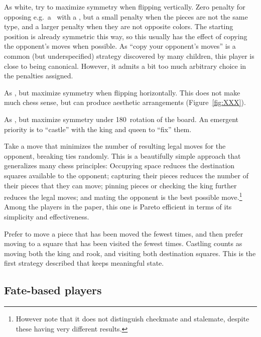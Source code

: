 \documentclass[10pt,preprint,twocolumn]{acmart}
\newcommand{\King}[1][1.95ex]{%
\adjustbox{Trim=2pt 2pt 2pt 0pt,width=#1,raise=-0.06ex,margin=0.13ex 0ex 0.13ex 0ex}{\BlackKingOnWhite}%
}%
\begin{document}
 As white, try to maximize symmetry
when flipping vertically. Zero penalty for opposing e.g.~a \King\, with
a \king, but a small penalty when the pieces are not the same type,
and a larger penalty when they are not opposite colors. The starting
position is already symmetric this way, so this usually has the effect
of copying the opponent's moves when possible. As ``copy your
opponent's moves'' is a common (but underspecified) strategy
discovered by many children, this player is close to being canonical.
However, it admits a bit too much arbitrary choice in the penalties
assigned.

 As , but
maximize symmetry when flipping horizontally. This does not make much
chess sense, but can produce aesthetic arrangements
(Figure~\ref{fig:XXX}).

 As , but maximize
symmetry under 180\degree\ rotation
of the board. An emergent priority is
to ``castle'' with the king and queen to ``fix'' them.

 Take a move that minimizes the
number of resulting legal moves for the opponent, breaking ties
randomly. This is a beautifully simple approach that generalizes many
chess principles: Occupying space reduces the destination squares
available to the opponent; capturing their pieces reduces the number
of their pieces that they can move; pinning pieces or checking the
king further reduces the legal moves; and mating the opponent is the
best possible move.\footnote{However note that it does not distinguish
  checkmate and stalemate, despite these having very different
  results.} Among the players in the paper, this one is Pareto
efficient in terms of its simplicity and effectiveness. \canonical

 Prefer to move a piece that has been
moved the fewest times, and then prefer moving to a square that
has been visited the fewest times. Castling counts as moving
both the king and rook, and visiting both destination squares.
This is the first strategy described that keeps meaningful state.
\canonical \stateful

\subsection{Fate-based players}
\end{document}
